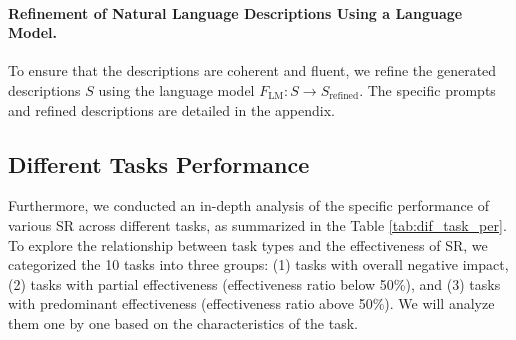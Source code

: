 \paragraph{Refinement of Natural Language Descriptions Using a Language Model.}
    To ensure that the descriptions are coherent and fluent, we refine the generated descriptions \( S \) using the language model \( F_{\text{LM}}: S \rightarrow S_{\text{refined}} \). The specific prompts and refined descriptions are detailed in the appendix. 

\subsection{Different Tasks Performance}
Furthermore, we conducted an in-depth analysis of the specific performance of various SR across different tasks, as summarized in the Table \ref{tab:dif_task_per}. To explore the relationship between task types and the effectiveness of SR, we categorized the 10 tasks into three groups: (1) tasks with overall negative impact, (2) tasks with partial effectiveness (effectiveness ratio below 50\%), and (3) tasks with predominant effectiveness (effectiveness ratio above 50\%). We will analyze them one by one based on the characteristics of the task.

